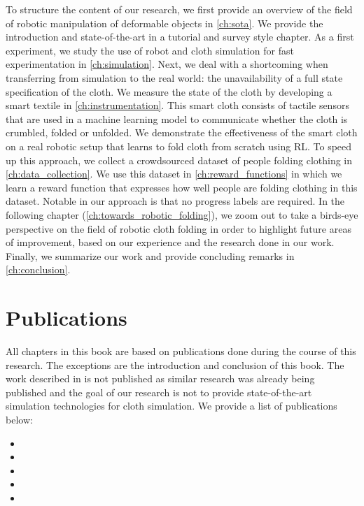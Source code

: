 \documentclass[\home/main.tex]{subfiles}
\begin{document}
To structure the content of our research, we first provide an overview of the field of robotic manipulation of deformable objects in \cref{ch:sota}. We provide the introduction and state-of-the-art in a tutorial and survey style chapter. As a first experiment, we study the use of robot and cloth simulation for fast experimentation in \cref{ch:simulation}. Next, we deal with a shortcoming when transferring from simulation to the real world: the unavailability of a full state specification of the cloth. We measure the state of the cloth by developing a smart textile in \cref{ch:instrumentation}. This smart cloth consists of tactile sensors that are used in a machine learning model to communicate whether the cloth is crumbled, folded or unfolded. We demonstrate the effectiveness of the smart cloth on a real robotic setup that learns to fold cloth from scratch using RL. To speed up this approach, we collect a crowdsourced dataset of people folding clothing in \cref{ch:data_collection}. We use this dataset in \cref{ch:reward_functions} in which we learn a reward function that expresses how well people are folding clothing in this dataset. Notable in our approach is that no progress labels are required.
In the following chapter (\cref{ch:towards_robotic_folding}), we zoom out to take a birds-eye perspective on the field of robotic cloth folding in order to highlight future areas of improvement, based on our experience and the research done in our work.
Finally, we summarize our work and provide concluding remarks in \cref{ch:conclusion}.

\section{Publications}
All chapters in this book are based on publications done during the course of this research. The exceptions are the introduction and conclusion of this book. The work described in  is not published as similar research was already being published and the goal of our research is not to provide state-of-the-art simulation technologies for cloth simulation. We provide a list of publications below:
\begin{itemize}
    \item {}
    \item {}
    \item {}
    \item {}
    \item {}
\end{itemize}
\end{document}
